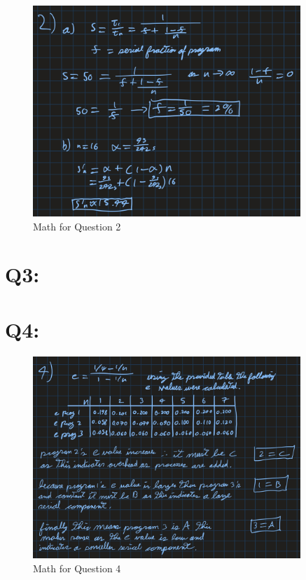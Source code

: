 \documentclass[11pt]{article}
\begin{document}
\begin{figure}[H]
\centering
    \includegraphics[width=0.9\textwidth]{./images/q2.jpg}
\caption{Math for Question 2}
\label{fig:q2}
\end{figure}

\newpage

\section*{Q3:}


\newpage

\section*{Q4:}

\begin{figure}[H]
\centering
    \includegraphics[width=0.9\textwidth]{./images/q4.jpg}
\caption{Math for Question 4}
\label{fig:q4}
\end{figure}
\end{document}
